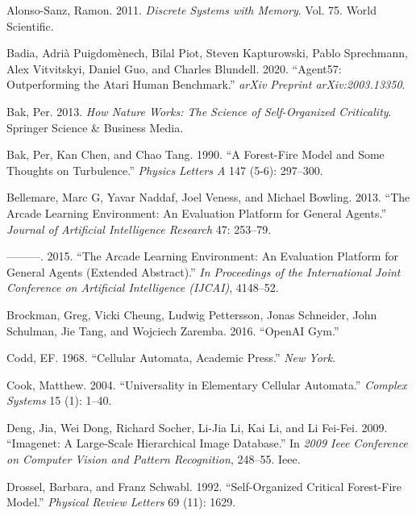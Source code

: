 \documentclass[
  12pt,
  openany]{book}
\newlength{\cslhangindent}
\newenvironment{cslreferences}%
  {\setlength{\parindent}{0pt}%
  \everypar{\setlength{\hangindent}{\cslhangindent}}\ignorespaces}%
  {\par}
\begin{document}
\hypertarget{refs}{}
\begin{cslreferences}
\leavevmode\hypertarget{ref-alonso2011discrete}{}%
Alonso-Sanz, Ramon. 2011. \emph{Discrete Systems with Memory}. Vol. 75. World Scientific.

\leavevmode\hypertarget{ref-badia2020agent57}{}%
Badia, Adrià Puigdomènech, Bilal Piot, Steven Kapturowski, Pablo Sprechmann, Alex Vitvitskyi, Daniel Guo, and Charles Blundell. 2020. ``Agent57: Outperforming the Atari Human Benchmark.'' \emph{arXiv Preprint arXiv:2003.13350}.

\leavevmode\hypertarget{ref-bak2013nature}{}%
Bak, Per. 2013. \emph{How Nature Works: The Science of Self-Organized Criticality}. Springer Science \& Business Media.

\leavevmode\hypertarget{ref-bak1990forest}{}%
Bak, Per, Kan Chen, and Chao Tang. 1990. ``A Forest-Fire Model and Some Thoughts on Turbulence.'' \emph{Physics Letters A} 147 (5-6): 297--300.

\leavevmode\hypertarget{ref-bellemare2013arcade}{}%
Bellemare, Marc G, Yavar Naddaf, Joel Veness, and Michael Bowling. 2013. ``The Arcade Learning Environment: An Evaluation Platform for General Agents.'' \emph{Journal of Artificial Intelligence Research} 47: 253--79.

\leavevmode\hypertarget{ref-bellemare2015arcade}{}%
---------. 2015. ``The Arcade Learning Environment: An Evaluation Platform for General Agents (Extended Abstract).'' \emph{In Proceedings of the International Joint Conference on Artificial Intelligence (IJCAI)}, 4148--52.

\leavevmode\hypertarget{ref-1606.01540}{}%
Brockman, Greg, Vicki Cheung, Ludwig Pettersson, Jonas Schneider, John Schulman, Jie Tang, and Wojciech Zaremba. 2016. ``OpenAI Gym.''

\leavevmode\hypertarget{ref-codd1968cellular}{}%
Codd, EF. 1968. ``Cellular Automata, Academic Press.'' \emph{New York}.

\leavevmode\hypertarget{ref-cook2004universality}{}%
Cook, Matthew. 2004. ``Universality in Elementary Cellular Automata.'' \emph{Complex Systems} 15 (1): 1--40.

\leavevmode\hypertarget{ref-deng2009imagenet}{}%
Deng, Jia, Wei Dong, Richard Socher, Li-Jia Li, Kai Li, and Li Fei-Fei. 2009. ``Imagenet: A Large-Scale Hierarchical Image Database.'' In \emph{2009 Ieee Conference on Computer Vision and Pattern Recognition}, 248--55. Ieee.

\leavevmode\hypertarget{ref-drossel1992self}{}%
Drossel, Barbara, and Franz Schwabl. 1992. ``Self-Organized Critical Forest-Fire Model.'' \emph{Physical Review Letters} 69 (11): 1629.


\end{cslreferences}
\end{document}
